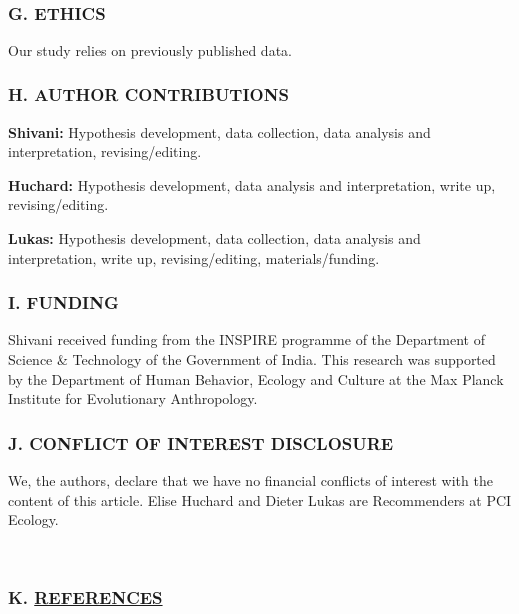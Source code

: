 \documentclass[]{article}
\begin{document}
~

\hypertarget{g.-ethics}{%
\subsubsection{G. ETHICS}\label{g.-ethics}}

Our study relies on previously published data.

\hypertarget{h.-author-contributions}{%
\subsubsection{H. AUTHOR CONTRIBUTIONS}\label{h.-author-contributions}}

\textbf{Shivani:} Hypothesis development, data collection, data analysis
and interpretation, revising/editing.

\textbf{Huchard:} Hypothesis development, data analysis and
interpretation, write up, revising/editing.

\textbf{Lukas:} Hypothesis development, data collection, data analysis
and interpretation, write up, revising/editing, materials/funding.

\hypertarget{i.-funding}{%
\subsubsection{I. FUNDING}\label{i.-funding}}

Shivani received funding from the INSPIRE programme of the Department of
Science \& Technology of the Government of India. This research was
supported by the Department of Human Behavior, Ecology and Culture at
the Max Planck Institute for Evolutionary Anthropology.

\hypertarget{j.-conflict-of-interest-disclosure}{%
\subsubsection{J. CONFLICT OF INTEREST
DISCLOSURE}\label{j.-conflict-of-interest-disclosure}}

We, the authors, declare that we have no financial conflicts of interest
with the content of this article. Elise Huchard and Dieter Lukas are
Recommenders at PCI Ecology.

~

\hypertarget{k.-references}{%
\subsubsection*{\texorpdfstring{K.
\href{MyLibrary.bib}{REFERENCES}}{K. REFERENCES}}\label{k.-references}}
\end{document}
